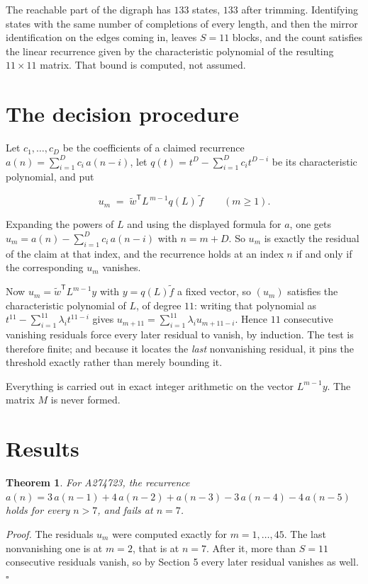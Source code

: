\documentclass[11pt]{article}
\newtheorem{theorem}{Theorem}
\theoremstyle{definition}
\begin{document}
The reachable part of the digraph has $133$ states, $133$ after trimming. Identifying states with the same number of completions of every length, and then the mirror identification on the edges coming in, leaves $S = 11$ blocks, and the count satisfies the linear recurrence given by the characteristic polynomial of the resulting $11\times11$ matrix. That bound is computed, not assumed.

\section{The decision procedure}

Let $c_1,\dots,c_D$ be the coefficients of a claimed recurrence $a(n) = \sum_{i=1}^{D} c_i\,a(n-i)$, let $q(t) = t^{D} - \sum_{i=1}^{D} c_i t^{D-i}$ be its characteristic polynomial, and put

\[u_m \;=\; \tilde w^{\mathsf T} L^{\,m-1} q(L)\,\tilde f \qquad (m \ge 1).\]

Expanding the powers of $L$ and using the displayed formula for $a$, one gets $u_m = a(n) - \sum_{i=1}^{D} c_i\,a(n-i)$ with $n = m + D$. So $u_m$ is exactly the residual of the claim at that index, and the recurrence holds at an index $n$ if and only if the corresponding $u_m$ vanishes.

Now $u_m = \tilde w^{\mathsf T} L^{m-1} y$ with $y = q(L)\tilde f$ a fixed vector, so $(u_m)$ satisfies the characteristic polynomial of $L$, of degree $11$: writing that polynomial as $t^{11} - \sum_{i=1}^{11} \lambda_i t^{11-i}$ gives $u_{m+11} = \sum_{i=1}^{11} \lambda_i u_{m+11-i}$. Hence $11$ consecutive vanishing residuals force every later residual to vanish, by induction. The test is therefore finite; and because it locates the {\itshape last} nonvanishing residual, it pins the threshold exactly rather than merely bounding it.

Everything is carried out in exact integer arithmetic on the vector $L^{m-1}y$. The matrix $M$ is never formed.

\section{Results}

\begin{theorem} For A274723, the recurrence $a(n) = 3\,a(n-1) + 4\,a(n-2) + a(n-3) - 3\,a(n-4) - 4\,a(n-5)$ holds for every $n > 7$, and fails at $n = 7$.\end{theorem}

{\itshape Proof.} The residuals $u_m$ were computed exactly for $m = 1,\dots,45$. The last nonvanishing one is at $m = 2$, that is at $n = 7$. After it, more than $S = 11$ consecutive residuals vanish, so by Section 5 every later residual vanishes as well. $\square$
\end{document}
